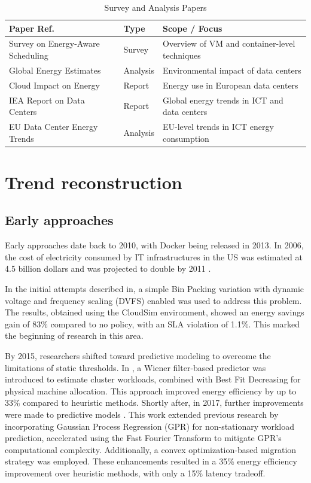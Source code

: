 \documentclass[runningheads]{llncs}
\begin{document}
\begin{table}[H]
\centering
\footnotesize
\begin{tabular}{|p{5.5cm}|p{3.5cm}|p{4cm}|}
\hline
\textbf{Paper Ref.} & \textbf{Type} & \textbf{Scope / Focus} \\
\hline
Survey on Energy-Aware Scheduling\cite{hameed_survey_2016}  & Survey & Overview of VM and container-level techniques \\
\hline
Global Energy Estimates\cite{masanet_2020} & Analysis & Environmental impact of data centers \\
\hline
Cloud Impact on Energy\cite{hintemann_2022} & Report & Energy use in European data centers \\
\hline
IEA Report on Data Centers\cite{IEADataCentres} & Report & Global energy trends in ICT and data centers \\
\hline
EU Data Center Energy Trends\cite{avgerinou_trends_2017} & Analysis & EU-level trends in ICT energy consumption \\
\hline
\end{tabular}
\caption{Survey and Analysis Papers}
\label{tab:surveys}
\end{table}

\section{Trend reconstruction}

\subsection{Early approaches}
Early approaches date back to 2010, with Docker being released in 2013. In 2006, the cost of electricity consumed by IT infrastructures in the US was estimated at 4.5 billion dollars and was projected to double by 2011 \cite{beloglazov_energy_2010}.

In the initial attempts described in\cite{beloglazov_energy_2010}, a simple Bin Packing variation with dynamic voltage and frequency scaling (DVFS) enabled was used to address this problem. The results, obtained using the CloudSim environment, showed an energy savings gain of 83\% compared to no policy, with an SLA violation of 1.1\%. This marked the beginning of research in this area.

By 2015, researchers shifted toward predictive modeling to overcome the limitations of static thresholds. In \cite{dabbagh_energy-efficient_2015},
a Wiener filter-based predictor was introduced to estimate cluster workloads, 
combined with Best Fit Decreasing for physical machine allocation.
This approach improved energy efficiency by up to 33\% compared to heuristic methods.
Shortly after, in 2017, further improvements were made to predictive models \cite{bui_energy_2017}.
This work extended previous research by incorporating Gaussian Process Regression (GPR) for non-stationary workload prediction,
accelerated using the Fast Fourier Transform to mitigate GPR's computational complexity.
Additionally, a convex optimization-based migration strategy was employed.
These enhancements resulted in a 35\% energy efficiency improvement over heuristic methods, with only a 15\% latency tradeoff.
\end{document}
